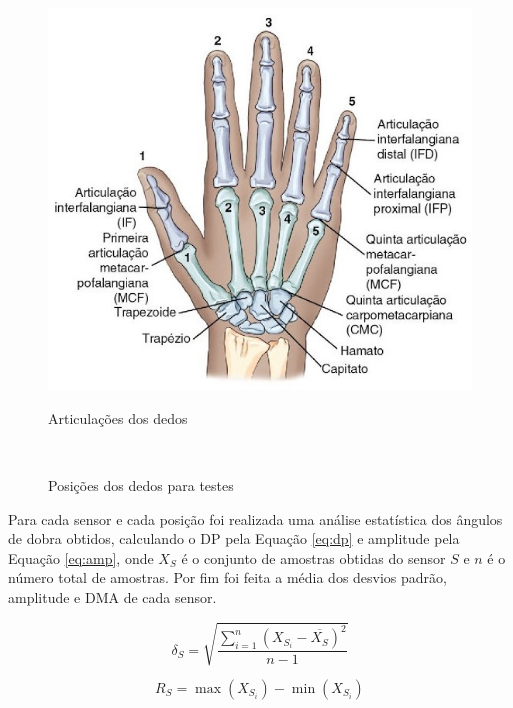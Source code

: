 \begin{figure}[H]
  \setlength{\abovecaptionskip}{0pt}
  \setlength{\belowcaptionskip}{0pt}
  \caption[Articulações dos dedos]{Articulações dos dedos}
  \centering
  \includegraphics[width=.55\textwidth]{imagem/articulacoes}
  \captionsetup{justification=centering}
  \label{fig:art}
\end{figure}

\begin{figure}[H]
  \setlength{\abovecaptionskip}{0pt}
  \setlength{\belowcaptionskip}{0pt}
  \caption[Posições dos dedos para testes]{Posições dos dedos para testes}
  \centering
  \\
  \captionsetup{justification=centering}
  \label{fig:pos}
\end{figure}

Para cada sensor e cada posição foi realizada uma análise estatística dos ângulos de dobra obtidos, calculando o \ac{DP} pela Equação \ref{eq:dp} e amplitude pela Equação \ref{eq:amp}, onde $X_S$ é o conjunto de amostras obtidas do sensor $S$ e $n$ é o número total de amostras. Por fim foi feita a média dos desvios padrão, amplitude e \ac{DMA} de cada sensor.

\begin{equation} \label{eq:dp}
	\delta_S = \sqrt{\frac{\sum_{i=1}^n(X_{S_i} - \overline{X_S})^2}{n-1}}
\end{equation}

\begin{equation} \label{eq:amp}
	R_S = \max(X_{S_i}) - \min(X_{S_i})
\end{equation}
